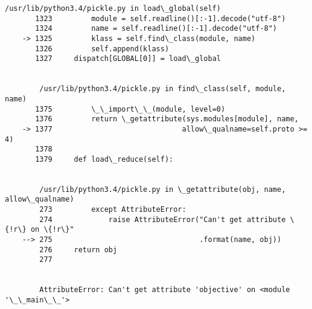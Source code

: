 \documentclass[11pt]{article}
\begin{document}
\begin{Verbatim}[commandchars=\\\{\}]
        /usr/lib/python3.4/pickle.py in load\_global(self)
       1323         module = self.readline()[:-1].decode("utf-8")
       1324         name = self.readline()[:-1].decode("utf-8")
    -> 1325         klass = self.find\_class(module, name)
       1326         self.append(klass)
       1327     dispatch[GLOBAL[0]] = load\_global


        /usr/lib/python3.4/pickle.py in find\_class(self, module, name)
       1375         \_\_import\_\_(module, level=0)
       1376         return \_getattribute(sys.modules[module], name,
    -> 1377                              allow\_qualname=self.proto >= 4)
       1378 
       1379     def load\_reduce(self):


        /usr/lib/python3.4/pickle.py in \_getattribute(obj, name, allow\_qualname)
        273         except AttributeError:
        274             raise AttributeError("Can't get attribute \{!r\} on \{!r\}"
    --> 275                                  .format(name, obj))
        276     return obj
        277 


        AttributeError: Can't get attribute 'objective' on <module '\_\_main\_\_'>

    \end{Verbatim}



    
    




    
    
\end{document}
